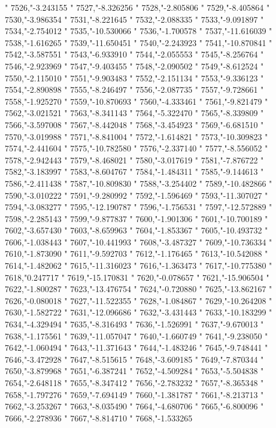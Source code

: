 "
7526,"-3.243155
"
7527,"-8.326256
"
7528,"-2.805806
"
7529,"-8.405864
"
7530,"-3.986354
"
7531,"-8.221645
"
7532,"-2.088335
"
7533,"-9.091897
"
7534,"-2.754012
"
7535,"-10.530066
"
7536,"-1.700578
"
7537,"-11.616039
"
7538,"-1.616265
"
7539,"-11.650451
"
7540,"-2.243923
"
7541,"-10.870841
"
7542,"-3.587551
"
7543,"-6.933910
"
7544,"-2.055553
"
7545,"-8.256764
"
7546,"-2.923969
"
7547,"-9.403455
"
7548,"-2.090502
"
7549,"-8.612524
"
7550,"-2.115010
"
7551,"-9.903483
"
7552,"-2.151134
"
7553,"-9.336123
"
7554,"-2.890898
"
7555,"-8.246497
"
7556,"-2.087735
"
7557,"-9.728661
"
7558,"-1.925270
"
7559,"-10.870693
"
7560,"-4.333461
"
7561,"-9.821479
"
7562,"-3.021521
"
7563,"-8.341143
"
7564,"-5.322470
"
7565,"-8.339809
"
7566,"-3.597008
"
7567,"-8.442048
"
7568,"-3.454923
"
7569,"-6.681510
"
7570,"-3.019988
"
7571,"-8.841004
"
7572,"-1.614821
"
7573,"-10.309823
"
7574,"-2.441604
"
7575,"-10.782580
"
7576,"-2.337140
"
7577,"-8.556052
"
7578,"-2.942443
"
7579,"-8.468021
"
7580,"-3.017619
"
7581,"-7.876722
"
7582,"-3.183997
"
7583,"-8.604767
"
7584,"-1.484311
"
7585,"-9.144613
"
7586,"-2.411438
"
7587,"-10.809830
"
7588,"-3.254402
"
7589,"-10.482866
"
7590,"-3.010222
"
7591,"-9.280992
"
7592,"-1.596469
"
7593,"-11.307027
"
7594,"-3.083277
"
7595,"-12.190787
"
7596,"-1.756531
"
7597,"-12.572889
"
7598,"-2.285143
"
7599,"-9.877837
"
7600,"-1.901306
"
7601,"-10.700189
"
7602,"-3.657430
"
7603,"-8.659963
"
7604,"-1.853367
"
7605,"-10.493732
"
7606,"-1.038443
"
7607,"-10.441993
"
7608,"-3.487327
"
7609,"-10.736334
"
7610,"-1.873090
"
7611,"-9.592703
"
7612,"-1.176465
"
7613,"-10.542088
"
7614,"-1.482062
"
7615,"-11.316023
"
7616,"-1.363473
"
7617,"-10.775380
"
7618,"0.247717
"
7619,"-15.170831
"
7620,"-0.078657
"
7621,"-15.906504
"
7622,"-1.800287
"
7623,"-13.476754
"
7624,"-0.720880
"
7625,"-13.862167
"
7626,"-0.080018
"
7627,"-11.522355
"
7628,"-1.084867
"
7629,"-10.264208
"
7630,"-1.582722
"
7631,"-12.096686
"
7632,"-3.431443
"
7633,"-10.183299
"
7634,"-4.329494
"
7635,"-8.316493
"
7636,"-1.526991
"
7637,"-9.670013
"
7638,"-1.175561
"
7639,"-11.057047
"
7640,"-1.660749
"
7641,"-9.238050
"
7642,"-1.060494
"
7643,"-11.371643
"
7644,"-1.483246
"
7645,"-9.748441
"
7646,"-3.472928
"
7647,"-8.515615
"
7648,"-3.609185
"
7649,"-7.870344
"
7650,"-3.879968
"
7651,"-6.387241
"
7652,"-4.509284
"
7653,"-5.504838
"
7654,"-2.648118
"
7655,"-8.347412
"
7656,"-2.783232
"
7657,"-8.365348
"
7658,"-1.797276
"
7659,"-7.694149
"
7660,"-1.381787
"
7661,"-8.213713
"
7662,"-3.253267
"
7663,"-8.035490
"
7664,"-4.680706
"
7665,"-6.800096
"
7666,"-2.278936
"
7667,"-8.814710
"
7668,"-1.533265
